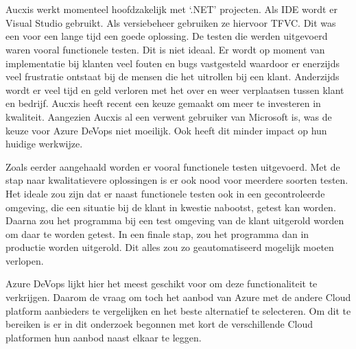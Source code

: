 
\chapter{}
\label{ch:methodologie}

Aucxis werkt momenteel hoofdzakelijk met ‘.NET’ projecten. Als IDE wordt er Visual Studio gebruikt. Als versiebeheer gebruiken ze hiervoor TFVC. Dit was een voor een lange tijd een goede oplossing. De testen die werden uitgevoerd waren vooral functionele testen. Dit is niet ideaal. Er wordt op moment van implementatie bij klanten veel fouten en bugs vastgesteld waardoor er enerzijds veel frustratie ontstaat bij de mensen die het uitrollen bij een klant. Anderzijds wordt er veel tijd en geld verloren met het over en weer verplaatsen tussen klant en bedrijf. Aucxis heeft recent een keuze gemaakt om meer te investeren in kwaliteit. Aangezien Aucxis al een verwent gebruiker van Microsoft is, was de keuze voor Azure DeVops niet moeilijk. Ook heeft dit minder impact op hun huidige werkwijze.

Zoals eerder aangehaald worden er vooral functionele testen uitgevoerd. Met de stap naar kwalitatievere oplossingen is er ook nood voor meerdere soorten testen. Het ideale zou zijn dat er naast functionele testen ook in een gecontroleerde omgeving, die een situatie bij de klant in kwestie nabootst, getest kan worden. Daarna zou het programma bij een test omgeving van de klant uitgerold worden om daar te worden getest. In een finale stap, zou het programma dan in productie worden uitgerold. Dit alles zou zo geautomatiseerd mogelijk moeten verlopen.

Azure DeVops lijkt hier het meest geschikt voor om deze functionaliteit te verkrijgen. Daarom de vraag om toch het aanbod van Azure met de andere Cloud platform aanbieders te vergelijken en het beste alternatief te selecteren. Om dit te bereiken is er in dit onderzoek begonnen met kort de verschillende Cloud platformen hun aanbod naast elkaar te leggen.


